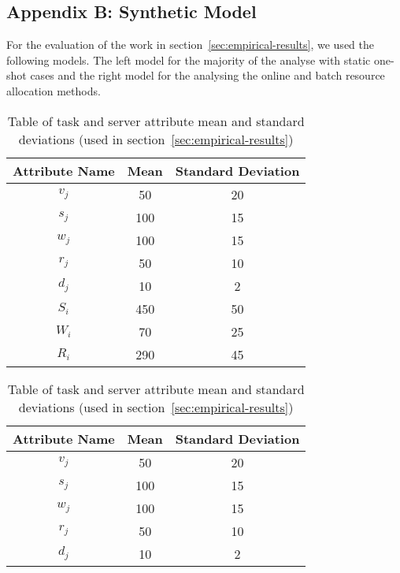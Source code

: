 \subsection*{Appendix B: Synthetic Model}
For the evaluation of the work in section~\ref{sec:empirical-results}, we used the following models. The left model
for the majority of the analyse with static one-shot cases and the right model for the analysing the online and batch
resource allocation methods.
\begin{table}[h]
    \begin{minipage}{2.8in}
        \begin{tabular}{|c|c|c|}
            \hline
            Attribute Name & Mean & Standard Deviation \\ \hline
            $v_j$          & 50   & 20                 \\ \hline
            $s_j$          & 100  & 15                 \\ \hline
            $w_j$          & 100  & 15                 \\ \hline
            $r_j$          & 50   & 10                 \\ \hline
            $d_j$          & 10   & 2                  \\ \hline
            $S_i$          & 450  & 50                 \\ \hline
            $W_i$          & 70   & 25                 \\ \hline
            $R_i$          & 290  & 45                 \\ \hline
        \end{tabular}
        \caption{Table of task and server attribute mean and standard deviations
        (used in section~\ref{sec:empirical-results})}
    \end{minipage}
    \begin{minipage}{2.8in}
        \begin{tabular}{|c|c|c|}
            \hline
            Attribute Name & Mean & Standard Deviation \\ \hline
            $v_j$          & 50   & 20                 \\ \hline
            $s_j$          & 100  & 15                 \\ \hline
            $w_j$          & 100  & 15                 \\ \hline
            $r_j$          & 50   & 10                 \\ \hline
            $d_j$          & 10   & 2                  \\ \hline

\end{tabular}
\end{minipage}
\end{table}
